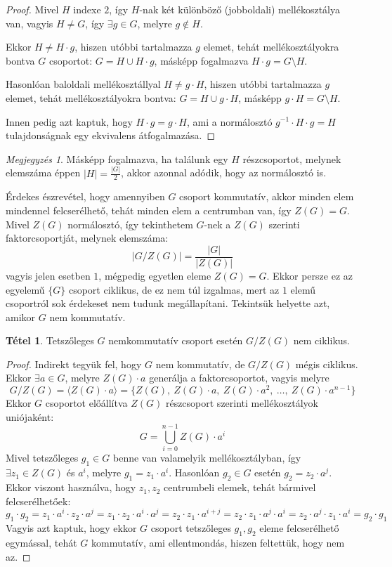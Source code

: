 \documentclass[12pt]{book}
\theoremstyle{plain} %
\theoremstyle{definition} %
\newtheorem{theo/}{Tétel}[section]
\newenvironment{theo}
  {\renewcommand{\qedsymbol}{$\clubsuit$}%
   \pushQED{\qed}\begin{theo/}}
  {\popQED\end{theo/}}
\theoremstyle{remark}
\newtheorem*{mj}{Megjegyzés}
\renewcommand\qedsymbol{$\blacksquare$}
\numberwithin{equation}{section}  %
\begin{document}
	\begin{proof}
		Mivel $H$ indexe $2$, így $H$-nak két különböző (jobboldali) mellékosztálya van, vagyis $H\neq G$, így $\exists g\in G$, melyre $g\notin H$.
		
		Ekkor $H\neq H\cdot g$, hiszen utóbbi tartalmazza $g$ elemet, tehát mellékosztályokra bontva $G$ csoportot: $G=H\cup H\cdot g$, másképp fogalmazva $H\cdot g = G\setminus H$.
		
		Hasonlóan baloldali mellékosztállyal $H \neq g\cdot H$, hiszen utóbbi tartalmazza $g$ elemet, tehát mellékosztályokra bontva: $G=H\cup g\cdot H$, másképp $g\cdot H = G\setminus H$.
		
		Innen pedig azt kaptuk, hogy $H\cdot g = g \cdot H$, ami a normálosztó $g^{-1} \cdot H \cdot g = H$ tulajdonságnak egy ekvivalens átfogalmazása.
	\end{proof}

	\begin{mj}
		Másképp fogalmazva, ha találunk egy $H$ részcsoportot, melynek elemszáma éppen $|H| = \frac{|G|}{2}$, akkor azonnal adódik, hogy az normálosztó is.
	\end{mj}

	Érdekes észrevétel, hogy amennyiben $G$ csoport kommutatív, akkor minden elem mindennel felcserélhető, tehát minden elem a centrumban van, így $Z(G) = G$. Mivel $Z(G)$ normálosztó, így tekinthetem $G$-nek a $Z(G)$ szerinti faktorcsoportját, melynek elemszáma:
	\[ |G/Z(G)| = \dfrac{|G|}{|Z(G)|}  \]
	vagyis jelen esetben $1$, mégpedig egyetlen eleme $Z(G) = G$. Ekkor persze ez az egyelemű $\{G\}$ csoport ciklikus, de ez nem túl izgalmas, mert az $1$ elemű csoportról sok érdekeset nem tudunk megállapítani. Tekintsük helyette azt, amikor $G$ nem kommutatív.

	\begin{theo}\label{zgNemCikl}
		Tetszőleges $G$ nemkommutatív csoport esetén $G/Z(G)$ nem ciklikus.
	\end{theo}
	
	\begin{proof}
		Indirekt tegyük fel, hogy $G$ nem kommutatív, de $G/Z(G)$ mégis ciklikus. Ekkor $\exists a\in G$, melyre $Z(G)\cdot a$ generálja a faktorcsoportot, vagyis melyre 
		\[ G/Z(G) = \langle Z(G)\cdot a \rangle = \{Z(G),\ Z(G)\cdot a,\ Z(G) \cdot a^2,\ \ldots,\ Z(G) \cdot a^{n-1} \} \]
		Ekkor $G$ csoportot előállítva $Z(G)$ részcsoport szerinti mellékosztályok uniójaként:
		\[ G=\bigcup_{i=0}^{n-1} Z(G) \cdot a^i\]
		Mivel tetszőleges $g_1\in G$ benne van valamelyik mellékosztályban, így $\exists z_1\in Z(G)$ és $a^i$, melyre $g_1 = z_1\cdot a^i$. Hasonlóan $g_2\in G$ esetén $g_2 = z_2\cdot a^j$. Ekkor viszont használva, hogy $z_1, z_2$ centrumbeli elemek, tehát bármivel felcserélhetőek:
		\[ g_1 \cdot g_2 = z_1 \cdot a^i \cdot z_2 \cdot a^j = z_1\cdot z_2\cdot a^i \cdot a^j = z_2 \cdot z_1 \cdot a^{i+j} = z_2 \cdot z_1 \cdot a^j \cdot a^i = z_2 \cdot a^j \cdot z_1\cdot a^i = g_2 \cdot g_1  \]
		Vagyis azt kaptuk, hogy ekkor $G$ csoport tetszőleges $g_1, g_2$ eleme felcserélhető egymással, tehát $G$ kommutatív, ami ellentmondás, hiszen feltettük, hogy nem az.
	\end{proof}
	
\end{document}

